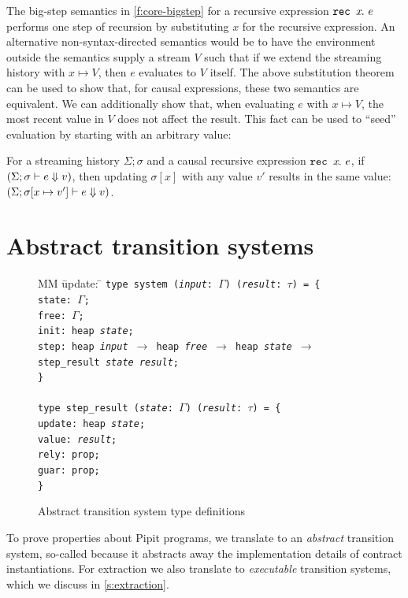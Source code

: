 \documentclass[a4paper,UKenglish,cleveref, autoref, thm-restate,anonymous]{lipics-v2021}
\begin{document}
The big-step semantics in \autoref{f:core-bigstep} for a recursive expression $\texttt{rec~} x\hspace{-0.1em}.~e$ performs one step of recursion by substituting $x$ for the recursive expression.
An alternative non-syntax-directed semantics would be to have the environment outside the semantics supply a stream $V$ such that if we extend the streaming history with $x \mapsto V$, then $e$ evaluates to $V$ itself.
The above substitution theorem can be used to show that, for causal expressions, these two semantics are equivalent.
We can additionally show that, when evaluating $e$ with $x \mapsto V$, the most recent value in $V$ does not affect the result.
This fact can be used to ``seed'' evaluation by starting with an arbitrary value:
\begin{theorem}
  For a streaming history $\Sigma; \sigma$ and a causal recursive expression $\texttt{rec~} x\hspace{-0.1em}.~e$, if $(\Sigma; \sigma \vdash e \Downarrow v)$, then updating $\sigma[x]$ with any value $v'$ results in the same value: $(\Sigma; \sigma[x \mapsto v'] \vdash e \Downarrow v)$.
\end{theorem}

 







 

\section{Abstract transition systems}
\label{s:transition}


\begin{figure}
  \begin{tabbing}
  MM \= update: \= \kill
  \tt{type} system (\textit{input}: $\Gamma$) (\textit{result}: $\tau$) = \{ \\
  \> state:  \> $\Gamma$; \\
  \> free: \> $\Gamma$; \\
  \> init: \> heap \textit{state}; \\
  \> step: \> heap \textit{input} $\to$ heap \textit{free} $\to$ heap \textit{state} $\to$ step_result \textit{state} \textit{result}; \\
  \} \\
  \\
  \tt{type} step_result (\textit{state}: $\Gamma$) (\textit{result}: $\tau$) = \{ \\
  \> update:  \> heap \textit{state}; \\
  \> value: \> \textit{result}; \\
  \> rely: \> \tt{prop}; \\
  \> guar: \> \tt{prop}; \\
  \}
  \end{tabbing}
  \caption{Abstract transition system type definitions}
  \label{f:system-types}
\end{figure} 
To prove properties about Pipit programs, we translate to an \emph{abstract} transition system, so-called because it abstracts away the implementation details of contract instantiations.
For extraction we also translate to \emph{executable} transition systems, which we discuss in \autoref{s:extraction}.
\end{document}
